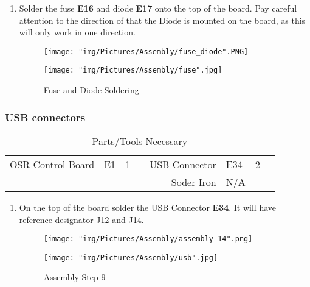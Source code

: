 \documentclass[12pt]{article}
\begin{document}
\begin{enumerate}

\item Solder the fuse \textbf{E16} and diode \textbf{E17} onto the top of the board. Pay careful attention to the direction of that the Diode is mounted on the board, as this will only work in one direction.

\begin{figure}[H]
  \centering
  \begin{minipage}[b]{0.45\textwidth}
    \texttt{[image: "img/Pictures/Assembly/fuse\_diode".PNG]}
  \end{minipage}
  \hfill
  \begin{minipage}[b]{0.45\textwidth}
    \texttt{[image: "img/Pictures/Assembly/fuse".jpg]}
  \end{minipage}
  \caption{Fuse and Diode Soldering}
  \label{assem_9}
\end{figure}

\end{enumerate}



\subsubsection{USB connectors}

\begin{table}[H]
    \centering
    \sffamily\footnotesize
    \caption{Parts/Tools Necessary}
    \begin{tabular}{|N|Q|Q|I|N|Q|Q|I|}
        \hline
         &  &  &  &  &  &  &  \\ \hline
        OSR Control Board & E1 & 1 &  & USB Connector & E34 & 2 &  \\ \hline
         & & & & Soder Iron & N/A & &  \\ \hline
    \end{tabular}
\end{table}

\begin{enumerate}

\item On the top of the board solder the USB Connector \textbf{E34}. It will have reference designator J12 and J14.

\begin{figure}[H]
  \centering
  \begin{minipage}[b]{0.45\textwidth}
    \texttt{[image: "img/Pictures/Assembly/assembly\_14".png]}
  \end{minipage}
  \hfill
  \begin{minipage}[b]{0.45\textwidth}
    \texttt{[image: "img/Pictures/Assembly/usb".jpg]}
  \end{minipage}
  \caption{Assembly Step 9}
  \label{assem_9}
\end{figure}

\end{enumerate}
\end{document}
